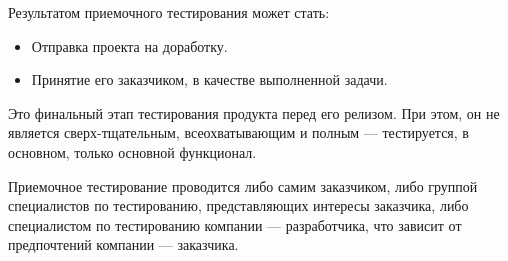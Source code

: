 \documentclass[12pt]{article}
\begin{document}
    Результатом приемочного тестирования может стать:
    \begin{itemize}
        \item Отправка проекта на доработку.
        \item Принятие его заказчиком, в качестве выполненной задачи.
    \end{itemize}
    Это финальный этап тестирования продукта перед его релизом. При этом, он не является сверх-тщательным, всеохватывающим и полным --- тестируется, в основном, только основной функционал.

    \vspace{5pt}

    Приемочное тестирование проводится либо самим заказчиком, либо группой специалистов по тестированию, представляющих интересы заказчика, либо специалистом по тестированию компании --- разработчика, что зависит от предпочтений компании --- заказчика.

    \vspace{5pt}
\end{document}
